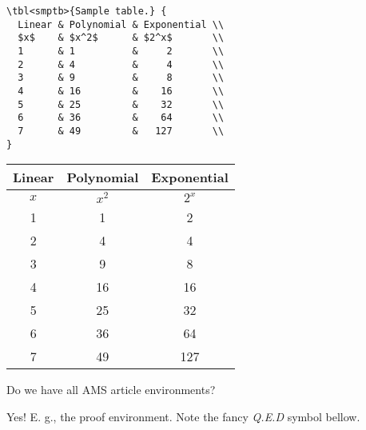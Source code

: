 \documentclass{homework}
\begin{document}
\medskip
\begin{minipage}{0.45\textwidth}
  \begin{verbatim}
\tbl<smptb>{Sample table.} {
  Linear & Polynomial & Exponential \\
  $x$    & $x^2$      & $2^x$       \\
  1      & 1          &     2       \\
  2      & 4          &     4       \\
  3      & 9          &     8       \\
  4      & 16         &    16       \\
  5      & 25         &    32       \\
  6      & 36         &    64       \\
  7      & 49         &   127       \\
}
    \end{verbatim}
\end{minipage}
\hfill
\begin{minipage}{0.45\textwidth} \hspace{1.9em}
  \begin{tabular}{||c | c | c ||} \hline
    Linear & Polynomial & Exponential \\ \hline
    $x$    & $x^2$      & $2^x$       \\ \hline
    1      & 1          & 2           \\ \hline
    2      & 4          & 4           \\ \hline
    3      & 9          & 8           \\ \hline
    4      & 16         & 16          \\ \hline
    5      & 25         & 32          \\ \hline
    6      & 36         & 64          \\ \hline
    7      & 49         & 127         \\ \hline
  \end{tabular}
  \captionsetup{type=table}
  \label{smptb}
\end{minipage}

\question Do we have all AMS article environments?

Yes! E. g., the proof environment. Note the fancy \textit{Q.E.D} symbol bellow.
\end{document}
